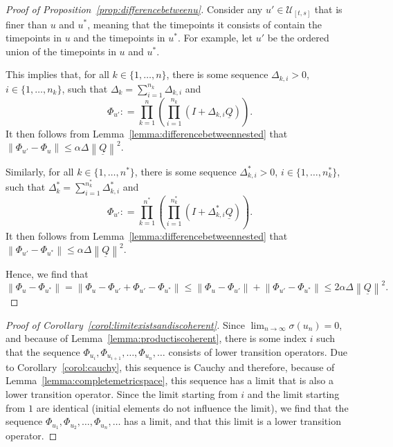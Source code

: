 \documentclass[10pt]{paper}
\theoremstyle{definition}
\newcommand{\lrate}{\underline{Q}}
\newcommand{\norm}[1]{\left\lVert #1 \right\rVert}
\newcommand{\coloneqq}{:\!=}
\begin{document}
\begin{proof}[Proof of Proposition~\ref{prop:differencebetweenu}]
Consider any $u'\in\mathcal{U}_{[t,s]}$ that is finer than $u$ and $u^*$, meaning that the timepoints it consists of contain the timepoints in $u$ and the timepoints in $u^*$. For example, let $u'$ be the ordered union of the timepoints in $u$ and $u^*$.

This implies that, for all $k\in\{1,\dots,n\}$, there is some sequence $\Delta_{k,i}>0$, $i\in\{1,\dots,n_k\}$, such that $\Delta_k=\sum_{i=1}^{n_k}\Delta_{k,i}$ and
\begin{equation*}
\Phi_{u'}\coloneqq\prod_{k=1}^n\left(\prod_{i=1}^{n_k}(I+\Delta_{k,i}\lrate)\right).
\end{equation*}
It then follows from Lemma~\ref{lemma:differencebetweennested} that $\norm{\Phi_{u'}-\Phi_u}\leq\alpha\Delta\norm{\lrate}^2$. 

Similarly, for all $k\in\{1,\dots,n^*\}$, there is some sequence $\Delta^*_{k,i}>0$, $i\in\{1,\dots,n^*_k\}$, such that $\Delta^*_k=\sum_{i=1}^{n^*_k}\Delta^*_{k,i}$ and
\begin{equation*}
\Phi_{u'}\coloneqq\prod_{k=1}^{n^*}\left(\prod_{i=1}^{n^*_k}(I+\Delta^*_{k,i}\lrate)\right).
\end{equation*}
It then follows from Lemma~\ref{lemma:differencebetweennested} that $\norm{\Phi_{u'}-\Phi_{u^*}}\leq\alpha\Delta\norm{\lrate}^2$.

Hence, we find that
\begin{equation*}
\norm{\Phi_{u}-\Phi_{u^*}}
=
\norm{\Phi_{u}-\Phi_{u'}+\Phi_{u'}-\Phi_{u^*}}
\leq
\norm{\Phi_{u}-\Phi_{u'}}
+
\norm{\Phi_{u'}-\Phi_{u^*}}
\leq2\alpha\Delta\norm{\lrate}^2.
\end{equation*}
\end{proof}

\begin{proof}[Proof of Corollary~\ref{corol:limitexistsandiscoherent}]
Since $\lim_{n\to\infty}\sigma(u_n)=0$, and because of Lemma~\ref{lemma:productiscoherent}, there is some index $i$ such that the sequence $\Phi_{u_i},\Phi_{u_{i+1}},\dots,\Phi_{u_n},\dots$ consists of lower transition operators. Due to Corollary~\ref{corol:cauchy}, this sequence is Cauchy and therefore, because of Lemma~\ref{lemma:completemetricspace}, this sequence has a limit that is also a lower transition operator. Since the limit starting from $i$ and the limit starting from $1$ are identical (initial elements do not influence the limit), we find that the sequence $\Phi_{u_1},\Phi_{u_2},\dots,\Phi_{u_n},\dots$ has a limit, and that this limit is a lower transition operator.
\end{proof}
\end{document}
